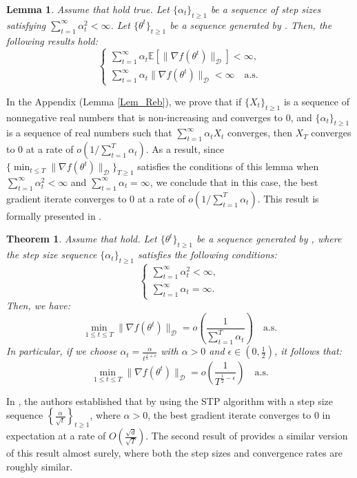 \documentclass{article} %
\newtheorem{theorem}{Theorem}
\newtheorem{lemma}{Lemma}
\begin{document}
\begin{lemma}\label{Lemma2}Assume that  hold true. Let \(\{\alpha_t\}_{t \ge 1}\) be a sequence of step sizes satisfying \(\sum_{t=1}^{\infty} \alpha_t^2 < \infty\). Let \(\{\theta^t\}_{t \ge 1}\) be a sequence generated by . Then, the following results hold:
\[
\begin{cases}
 \sum_{t=1}^{\infty} \alpha_t  \mathbb{E}\left[ \lVert \nabla f(\theta^t) \rVert_{\mathcal{D}} \right] < \infty, \\
    \sum_{t=1}^{\infty} \alpha_t \lVert \nabla f(\theta^t) \rVert_{\mathcal{D}} < \infty \quad \text{a.s.}
\end{cases}
\]

\end{lemma}

\vspace{0.1cm}
In the Appendix (Lemma \ref{Lem_Reb}), we prove that if \( \{X_t\}_{t \geq 1} \) is a sequence of nonnegative real numbers that is non-increasing and converges to 0, and \( \{ \alpha_t \}_{t \geq 1} \) is a sequence of real numbers such that \( \sum_{t=1}^{\infty} \alpha_t X_t \) converges, then \( X_T \) converges to 0 at a rate of \( o\left(1 /\sum_{t=1}^T \alpha_t \right) \). As a result, since \( \{\min_{t \leq T} \|\nabla f(\theta^t)\|_{\mathcal{D}} \}_{T \geq 1} \) satisfies the conditions of this lemma when \(\sum_{t=1}^{\infty} \alpha_t^2<\infty \)  and \(\sum_{t=1}^{\infty} \alpha_t = \infty\), we conclude that in this case, the best gradient iterate converges to $0$ at a rate of \( o\left(1 /\sum_{t=1}^T \alpha_t \right) \). This result is formally presented in .




\begin{theorem}\label{Thm1}
Assume that  hold. Let \( \{\theta^t\}_{t \ge 1} \) be a sequence generated by , where the step size sequence \( \{\alpha_t\}_{t \ge 1} \) satisfies the following conditions:
\[
\begin{cases}
    \sum_{t=1}^{\infty} \alpha_t^2 < \infty, \\
    \sum_{t=1}^{\infty} \alpha_t = \infty.
\end{cases}
\]
Then, we have:
\[
\min_{1 \leq t \leq T} \lVert \nabla f(\theta^t) \rVert_{\mathcal{D}} = o\left(\frac{1}{\sum_{t=1}^{T} \alpha_t}\right) \quad \text{a.s.}
\]
In particular, if we choose \( \alpha_t = \frac{\alpha}{t^{\frac{1}{2} + \epsilon}} \) with \( \alpha > 0 \) and \( \epsilon \in \left(0, \frac{1}{2}\right) \), it follows that:
\[
\min_{1 \leq t \leq T} \lVert \nabla f(\theta^t) \rVert_{\mathcal{D}} = o\left(\frac{1}{T^{\frac{1}{2} - \epsilon}}\right) \quad \text{a.s.}
\]

\end{theorem}
In \cite[Theorem 4.1]{bergou2020stochastic}, the authors established that by using the STP algorithm with a step size sequence \(\left\{\frac{\alpha}{\sqrt{t}}\right\}_{t \ge 1}\), where \(\alpha > 0\), the best gradient iterate converges to 0 in expectation at a rate of \(O\left(\frac{\sqrt{d}}{\sqrt{T}}\right)\). The second result of  provides a similar version of this result almost surely, where both the step sizes and convergence rates are roughly similar.
\end{document}
